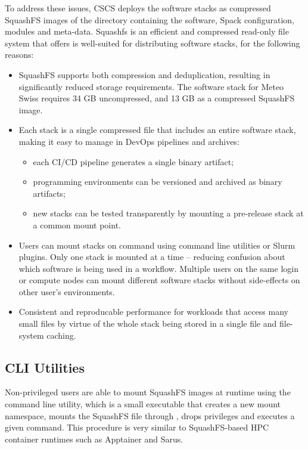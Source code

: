 To address these issues, CSCS deploys the software stacks as compressed SquashFS images of the directory containing the software, Spack configuration, modules and meta-data.
Squashfs is an efficient and compressed read-only file system that offers is well-suited for distributing software stacks, for the following reasons:
\begin{itemize}
    \item SquashFS supports both compression and deduplication, resulting in significantly reduced storage requirements.
          The software stack for Meteo Swiss requires 34 GB uncompressed, and 13 GB as a compressed SquashFS image.
    \item Each stack is a single compressed file that includes an entire software stack, making it easy to manage in DevOps pipelines and archives:
    \begin{itemize}
        \item each CI/CD pipeline generates a single binary artifact;
        \item programming environments can be versioned and archived as binary artifacts;
        \item new stacks can be tested transparently by mounting a pre-release stack at a common mount point.
    \end{itemize}
    \item Users can mount stacks on command using command line utilities or Slurm plugins.
        Only one stack is mounted at a time -- reducing confusion about which software is being used in a workflow.
        Multiple users on the same login or compute nodes can mount different software stacks without side-effects on other user's environments.
    \item Consistent and reproducable performance for workloads that access many small files by virtue of the whole stack being stored in a single file and file-system caching.
\end{itemize}

\subsection{CLI Utilities}

Non-privileged users are able to mount SquashFS images at runtime using the  command line utility, which is a small  executable that creates a new mount namespace, mounts the SquashFS file through , drops privileges and executes a given command.
This procedure is very similar to SquashFS-based HPC container runtimes such as Apptainer and Sarus.

